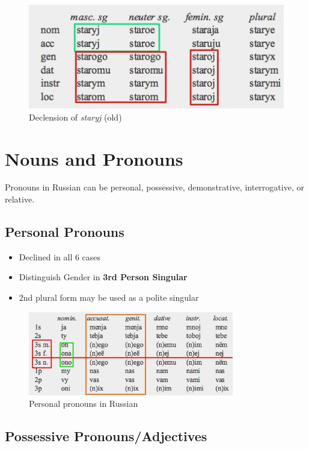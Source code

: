 \documentclass[
  a4paperpaper,
]{report}
\providecommand{\tightlist}{%
  \setlength{\itemsep}{0pt}\setlength{\parskip}{0pt}}
\begin{document}
\begin{figure}
\centering
\includegraphics{./adj.jpg}
\caption{Declension of \emph{staryj} (old)}
\end{figure}

\hypertarget{nouns-and-pronouns}{%
\section{Nouns and Pronouns}\label{nouns-and-pronouns}}

Pronouns in Russian can be personal, possessive, demonstrative,
interrogative, or relative.

\hypertarget{personal-pronouns}{%
\subsection{Personal Pronouns}\label{personal-pronouns}}

\begin{itemize}
\tightlist
\item
  Declined in all 6 cases
\item
  Distinguish Gender in \textbf{3rd Person Singular}
\item
  2nd plural form may be used as a polite singular
\end{itemize}

\begin{figure}
\centering
\includegraphics[width=0.8\textwidth,height=\textheight]{./perspron.jpg}
\caption{Personal pronouns in Russian}
\end{figure}

\hypertarget{possessive-pronounsadjectives}{%
\subsection{Possessive
Pronouns/Adjectives}\label{possessive-pronounsadjectives}}
\end{document}
